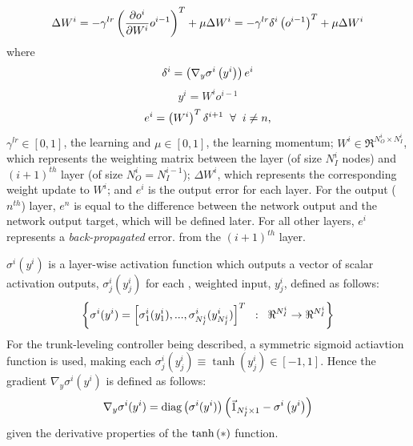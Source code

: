			\begin{equation}
				\Delta W^{i} =
					-\gamma^{lr} \left( \frac{ \partial o^{i} }{\partial {W^{i} } }  o^{i-1} \right)^{T}  + \mu \Delta W^{i} = 
					-\gamma^{lr} \delta^{i} \left(o^{i-1}\right)^{T}  + \mu \Delta W^{i}
				\label{eq::bp_weight_update}
			\end{equation} 
			where
			\begin{equation*}
				\delta^{i} = \left( \nabla_{y} \sigma^{i}\left(y^{i}\right) \right) e^{i}
				\label{eq::bp_error}
			\end{equation*}
			\begin{equation*}
				y^{i} = W^{i} o^{i-1}
				\label{eq::bp_error}
			\end{equation*}
			\begin{equation*}
				e^{i} =  \left( W^{i} \right)^{T} \delta^{i+1} \hspace{2mm} \forall \hspace{2mm} i\neq n,
			\end{equation*}
			$\gamma^{lr} \in [0,1]$, the learning and  $\mu \in [0,1]$, the learning momentum; $W^{i} \in \Re^{N_{O}^{i}\times N_{I}^{i}}$, which represents the weighting matrix between the \Ith layer (of size $N_{I}^{i}$ nodes) and $(i+1)^{th}$ layer (of size $N_{O}^{i}=N_{I}^{i-1}$); $\Delta W^{i}$, which represents the corresponding weight update to $W^{i}$; and $e^{i}$ is the output error for each \Ith layer. For the output ($n^{th}$) layer, $e^{n}$ is equal to the difference between the network output and the network output target, which will be defined later. For all other layers, $e^{i}$ represents a \emph{back-propagated} error. from the $(i+1)^{th}$ layer.


			$\sigma^{i}(y^{i})$ is a layer-wise activation function which outputs a vector of scalar activation outputs, $\sigma_{j}^{i}(y_{j}^{i}) $ for each \Jth, weighted input, $y_{j}^{i}$, defined as follows:
			\begin{equation*}
				\left\{ \sigma^{i}(y^{i}) = \left[ \sigma_{1}^{i}(y_{1}^{i}),...,\sigma_{N_{I}^{i}}^{i}(y_{N_{I}^{i}}^{i}) \right]^{T} \hspace{2mm} : \hspace{2mm} \Re^{N_{I}^{i}} \rightarrow \Re^{N_{I}^{i}}\right\}
			\end{equation*}
For the trunk-leveling controller being described, a symmetric sigmoid actiavtion function is used, making each $\sigma_{j}^{i}(y_{j}^{i}) \equiv \tanh(y_{j}^{i}) \in [-1,1]$. Hence the gradient $\nabla_{y} \sigma^{i}(y^{i})$ is defined as follows: 
			\begin{equation}
				\nabla_{y} \sigma^{i}(y^{i})  = \text{diag}\left(\sigma^{i}(y^{i})\right) \left(\vec{1}_{N_{I}^{i}\times1} - \sigma^{i}\left(y^{i} \right) \right)
				\label{eq::bp_sigmoid_deriv}
			\end{equation} 
			given the derivative properties of the $\tanh\left(*\right)$ function.
			

